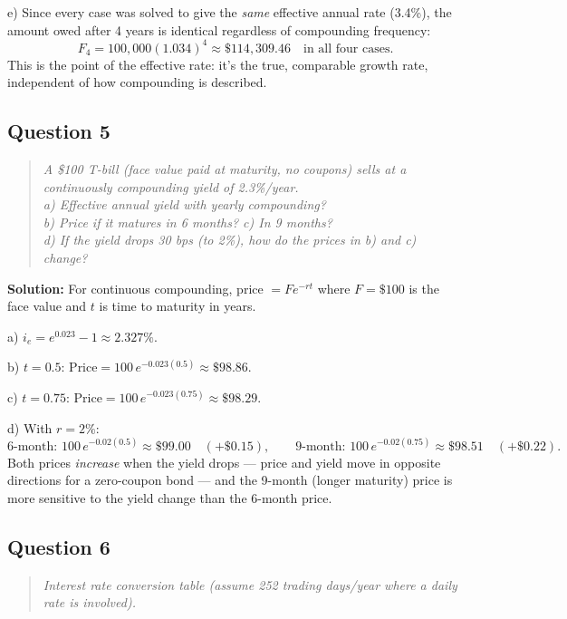 \documentclass[11pt,letterpaper]{article}
\begin{document}
e) Since every case was solved to give the \emph{same} effective
annual rate (3.4\%), the amount owed after 4 years is identical
regardless of compounding frequency:
\[F_4 = 100{,}000(1.034)^4 \approx \$114{,}309.46 \quad \text{in all four cases.}\]
This is the point of the effective rate: it's the true, comparable
growth rate, independent of how compounding is described.

\subsection{Question 5}
\begin{quote}
    \itshape
    A \$100 T-bill (face value paid at maturity, no coupons) sells at a
    continuously compounding yield of 2.3\%/year.
    \\ a) Effective annual yield with yearly compounding?
    \\ b) Price if it matures in 6 months? c) In 9 months?
    \\ d) If the yield drops 30 bps (to 2\%), how do the prices in b)
    and c) change?
\end{quote}

\textbf{Solution:} For continuous compounding, price $= Fe^{-rt}$
where $F=\$100$ is the face value and $t$ is time to maturity in years.

a) $i_e = e^{0.023} - 1 \approx 2.327\%$.

b) $t = 0.5$: $\text{Price} = 100\,e^{-0.023(0.5)} \approx \$98.86$.

c) $t = 0.75$: $\text{Price} = 100\,e^{-0.023(0.75)} \approx \$98.29$.

d) With $r = 2\%$:
\[\text{6-month: } 100\,e^{-0.02(0.5)} \approx \$99.00 \quad (+\$0.15), \qquad \text{9-month: } 100\,e^{-0.02(0.75)} \approx \$98.51 \quad (+\$0.22).\]
Both prices \emph{increase} when the yield drops --- price and yield
move in opposite directions for a zero-coupon bond --- and the
9-month (longer maturity) price is more sensitive to the yield
change than the 6-month price.

\subsection{Question 6}
\begin{quote}
    \itshape
    Interest rate conversion table (assume 252 trading days/year where
    a daily rate is involved).
\end{quote}
\end{document}
